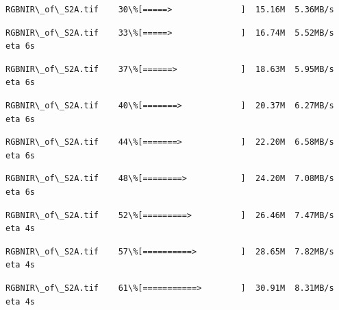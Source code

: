 \documentclass[11pt]{article}
\begin{document}
    \begin{Verbatim}[commandchars=\\\{\}]
 RGBNIR\_of\_S2A.tif    30\%[=====>              ]  15.16M  5.36MB/s
    \end{Verbatim}

    \begin{Verbatim}[commandchars=\\\{\}]
 RGBNIR\_of\_S2A.tif    33\%[=====>              ]  16.74M  5.52MB/s    eta 6s
    \end{Verbatim}

    \begin{Verbatim}[commandchars=\\\{\}]
 RGBNIR\_of\_S2A.tif    37\%[======>             ]  18.63M  5.95MB/s    eta 6s
    \end{Verbatim}

    \begin{Verbatim}[commandchars=\\\{\}]
 RGBNIR\_of\_S2A.tif    40\%[=======>            ]  20.37M  6.27MB/s    eta 6s
    \end{Verbatim}

    \begin{Verbatim}[commandchars=\\\{\}]
 RGBNIR\_of\_S2A.tif    44\%[=======>            ]  22.20M  6.58MB/s    eta 6s
    \end{Verbatim}

    \begin{Verbatim}[commandchars=\\\{\}]
 RGBNIR\_of\_S2A.tif    48\%[========>           ]  24.20M  7.08MB/s    eta 6s
    \end{Verbatim}

    \begin{Verbatim}[commandchars=\\\{\}]
 RGBNIR\_of\_S2A.tif    52\%[=========>          ]  26.46M  7.47MB/s    eta 4s
    \end{Verbatim}

    \begin{Verbatim}[commandchars=\\\{\}]
 RGBNIR\_of\_S2A.tif    57\%[==========>         ]  28.65M  7.82MB/s    eta 4s
    \end{Verbatim}

    \begin{Verbatim}[commandchars=\\\{\}]
 RGBNIR\_of\_S2A.tif    61\%[===========>        ]  30.91M  8.31MB/s    eta 4s
    \end{Verbatim}
\end{document}
